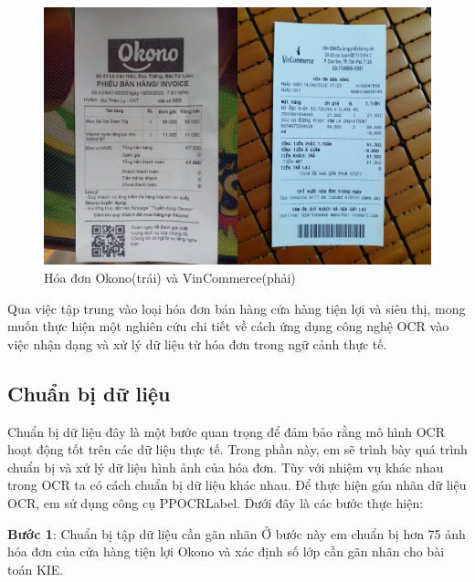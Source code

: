 \begin{figure}[h]
    \includegraphics[scale=0.20]{images/okono-vincom.png}
    \centering
    \caption{Hóa đơn Okono(trái) và VinCommerce(phải)}
    \label{fig9-okono-vincom}
\end{figure}

Qua việc tập trung vào loại hóa đơn bán hàng cửa hàng tiện lợi và siêu thị, mong muốn thực hiện một nghiên cứu chi tiết về cách ứng dụng công nghệ OCR vào việc nhận dạng và xử lý dữ liệu từ hóa đơn trong ngữ cảnh thực tế.

\subsection{Chuẩn bị dữ liệu}
Chuẩn bị dữ liệu đây là một bước quan trọng để đảm bảo rằng mô hình OCR hoạt động tốt trên các dữ liệu thực tế. Trong phần này, em sẽ trình bày quá trình chuẩn bị và xử lý dữ liệu hình ảnh của hóa đơn. Tùy với nhiệm vụ khác nhau trong OCR ta có cách chuẩn bị dữ liệu khác nhau. Để thực hiện gán nhãn dữ liệu OCR, em sử dụng công cụ PPOCRLabel. Dưới đây là các bước thực hiện:

\textbf{Bước 1}: Chuẩn bị tập dữ liệu cần gãn nhãn
Ở bước này em chuẩn bị hơn 75 ảnh hóa đơn của cửa hàng tiện lợi Okono và xác định số lớp cần gãn nhãn cho bài toán KIE.  

